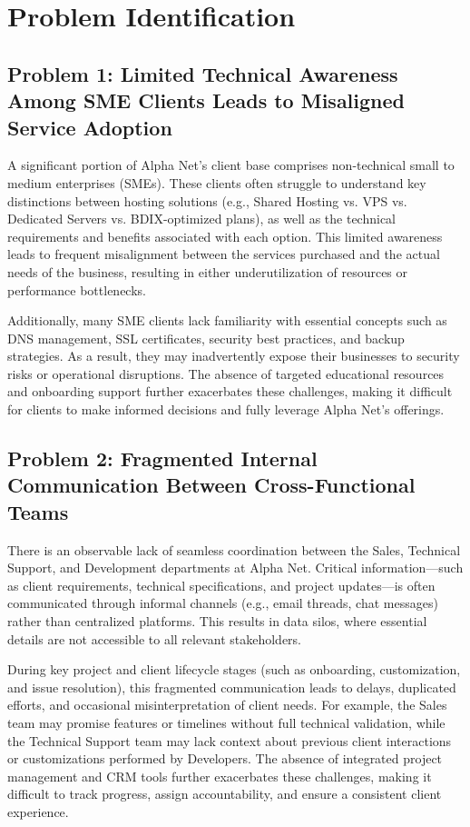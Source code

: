\section{Problem Identification}

\subsection{Problem 1: Limited Technical Awareness Among SME Clients Leads to Misaligned Service Adoption}

A significant portion of Alpha Net's client base comprises non-technical small to medium enterprises (SMEs). These clients often struggle to understand key distinctions between hosting solutions (e.g., Shared Hosting vs. VPS vs. Dedicated Servers vs. BDIX-optimized plans), as well as the technical requirements and benefits associated with each option. This limited awareness leads to frequent misalignment between the services purchased and the actual needs of the business, resulting in either underutilization of resources or performance bottlenecks.

Additionally, many SME clients lack familiarity with essential concepts such as DNS management, SSL certificates, security best practices, and backup strategies. As a result, they may inadvertently expose their businesses to security risks or operational disruptions. The absence of targeted educational resources and onboarding support further exacerbates these challenges, making it difficult for clients to make informed decisions and fully leverage Alpha Net's offerings.


\subsection{Problem 2: Fragmented Internal Communication Between Cross-Functional Teams}
There is an observable lack of seamless coordination between the Sales, Technical Support, and Development departments at Alpha Net. Critical information—such as client requirements, technical specifications, and project updates—is often communicated through informal channels (e.g., email threads, chat messages) rather than centralized platforms. This results in data silos, where essential details are not accessible to all relevant stakeholders.

During key project and client lifecycle stages (such as onboarding, customization, and issue resolution), this fragmented communication leads to delays, duplicated efforts, and occasional misinterpretation of client needs. For example, the Sales team may promise features or timelines without full technical validation, while the Technical Support team may lack context about previous client interactions or customizations performed by Developers. The absence of integrated project management and CRM tools further exacerbates these challenges, making it difficult to track progress, assign accountability, and ensure a consistent client experience.

